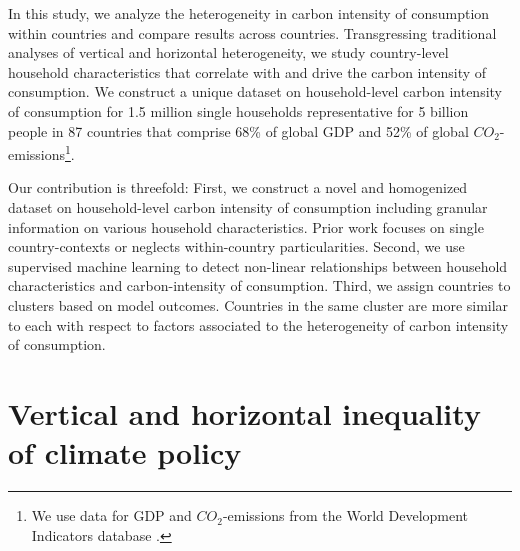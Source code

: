 \documentclass[12pt, a4paper]{article}
\begin{document}

In this study, we analyze the heterogeneity in carbon intensity of consumption within countries and compare results across countries. Transgressing traditional analyses of vertical and horizontal heterogeneity, we study country-level household characteristics that correlate with and drive the carbon intensity of consumption. We construct a unique dataset on household-level carbon intensity of consumption for 1.5 million single households representative for 5 billion people in 87 countries that comprise 68\% of global GDP and 52\% of global $CO_{2}$-emissions\footnote{We use data for GDP and $CO_{2}$-emissions from the World Development Indicators database \autocite{WorldBankGroup.2023}.}.



Our contribution is threefold: First, we construct a novel and homogenized dataset on household-level carbon intensity of consumption including granular information on various household characteristics. Prior work focuses on single country-contexts or neglects within-country particularities. Second, we use supervised machine learning to detect non-linear relationships between household characteristics and carbon-intensity of consumption. Third, we assign countries to clusters based on model outcomes. Countries in the same cluster are more similar to each with respect to factors associated to the heterogeneity of carbon intensity of consumption. 




\section{Vertical and horizontal inequality of climate policy} \label{sec:literature}
\end{document}
